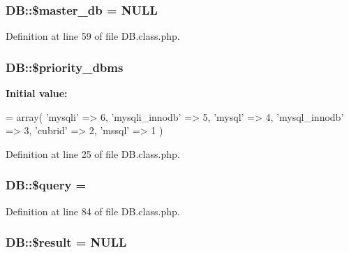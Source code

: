 \subsubsection[{\texorpdfstring{\$master\+\_\+db}{$master_db}}]{\setlength{\rightskip}{0pt plus 5cm}D\+B\+::\$master\+\_\+db = N\+U\+LL}\hypertarget{classDB_ad0a3ae175a659516131cfc6cd615d15c}{}\label{classDB_ad0a3ae175a659516131cfc6cd615d15c}


Definition at line 59 of file D\+B.\+class.\+php.

\subsubsection[{\texorpdfstring{\$priority\+\_\+dbms}{$priority_dbms}}]{\setlength{\rightskip}{0pt plus 5cm}D\+B\+::\$priority\+\_\+dbms}\hypertarget{classDB_a082292b9ca3855cbddd3a74e9490ca82}{}\label{classDB_a082292b9ca3855cbddd3a74e9490ca82}
{\bfseries Initial value\+:}
\begin{DoxyCode}
= array(
        \textcolor{stringliteral}{'mysqli'} => 6,
        \textcolor{stringliteral}{'mysqli\_innodb'} => 5,
        \textcolor{stringliteral}{'mysql'} => 4,
        \textcolor{stringliteral}{'mysql\_innodb'} => 3,
        \textcolor{stringliteral}{'cubrid'} => 2,
        \textcolor{stringliteral}{'mssql'} => 1
    )
\end{DoxyCode}


Definition at line 25 of file D\+B.\+class.\+php.

\subsubsection[{\texorpdfstring{\$query}{$query}}]{\setlength{\rightskip}{0pt plus 5cm}D\+B\+::\$query = \textquotesingle{}\textquotesingle{}}\hypertarget{classDB_a32ebabea908efd805a83db48fec3ab52}{}\label{classDB_a32ebabea908efd805a83db48fec3ab52}


Definition at line 84 of file D\+B.\+class.\+php.

\subsubsection[{\texorpdfstring{\$result}{$result}}]{\setlength{\rightskip}{0pt plus 5cm}D\+B\+::\$result = N\+U\+LL}\hypertarget{classDB_a74e74ee9d3311aa1e8107b8accd05e29}{}\label{classDB_a74e74ee9d3311aa1e8107b8accd05e29}


